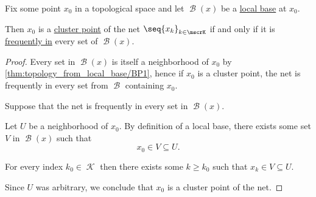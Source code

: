 \begin{proposition}\label{thm:net_cluster_point_base}
  Fix some point \( x_0 \) in a topological space and let \( \mscrB(x) \) be a \hyperref[def:topological_local_base]{local base} at \( x_0 \).

  Then \( x_0 \) is a \hyperref[def:net_cluster_point]{cluster point} of the net \( \seq{ x_k }_{k \in \mscrK} \) if and only if it is \hyperref[def:net_frequently_in]{frequently in} every set of \( \mscrB(x) \).
\end{proposition}
\begin{proof}
  \SufficiencySubProof Every set in \( \mscrB(x) \) is itself a neighborhood of \( x_0 \) by \ref{thm:topology_from_local_base/BP1}, hence if \( x_0 \) is a cluster point, the net is frequently in every set from \( \mscrB \) containing \( x_0 \).

  \NecessitySubProof Suppose that the net is frequently in every set in \( \mscrB(x) \).

  Let \( U \) be a neighborhood of \( x_0 \). By definition of a local base, there exists some set \( V \) in \( \mscrB(x) \) such that
  \begin{equation*}
    x_0 \in V \subseteq U.
  \end{equation*}

  For every index \( k_0 \in \mscrK \) then there exists some \( k \geq k_0 \) such that \( x_k \in V \subseteq U \).

  Since \( U \) was arbitrary, we conclude that \( x_0 \) is a cluster point of the net.
\end{proof}

